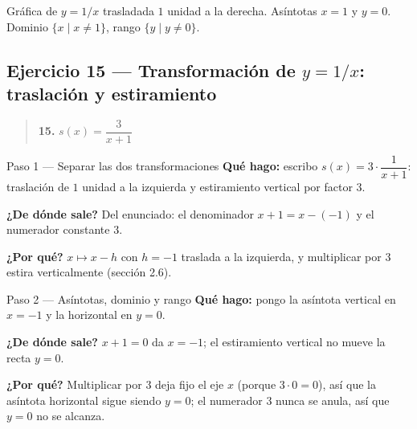 \documentclass[11pt]{article}
\begin{document}
\begin{center}
\end{center}

\begin{resp}
Gráfica de $y=1/x$ trasladada $1$ unidad a la derecha. Asíntotas $x=1$ y $y=0$.\\
Dominio $\{x\mid x\ne 1\}$, rango $\{y\mid y\ne 0\}$.
\end{resp}

\subsection*{Ejercicio 15 — Transformación de $y=1/x$: traslación y estiramiento}

\begin{quote}
\textbf{15.} $s(x)=\dfrac{3}{x+1}$
\end{quote}

\begin{paso}{Paso 1 --- Separar las dos transformaciones}
\textbf{Qué hago:} escribo $s(x)=3\cdot\dfrac{1}{x+1}$: traslación de $1$ unidad a la izquierda y estiramiento vertical por factor $3$.

\textbf{¿De dónde sale?} Del enunciado: el denominador $x+1=x-(-1)$ y el numerador constante $3$.

\textbf{¿Por qué?} $x\mapsto x-h$ con $h=-1$ traslada a la izquierda, y multiplicar por $3$ estira verticalmente (sección 2.6).
\end{paso}

\begin{paso}{Paso 2 --- Asíntotas, dominio y rango}
\textbf{Qué hago:} pongo la asíntota vertical en $x=-1$ y la horizontal en $y=0$.

\textbf{¿De dónde sale?} $x+1=0$ da $x=-1$; el estiramiento vertical no mueve la recta $y=0$.

\textbf{¿Por qué?} Multiplicar por $3$ deja fijo el eje $x$ (porque $3\cdot 0=0$), así que la asíntota horizontal sigue siendo $y=0$; el numerador $3$ nunca se anula, así que $y=0$ no se alcanza.
\end{paso}
\end{document}
